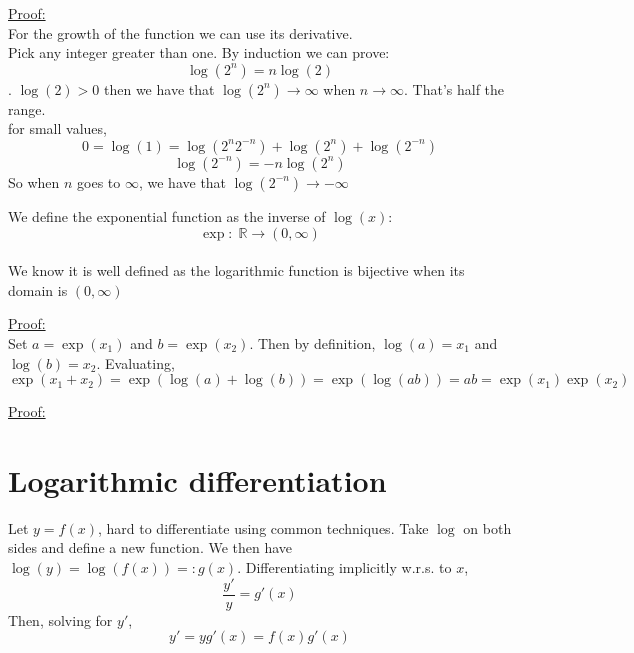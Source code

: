 \documentclass{book}
\newtheorem{theorem}{Theorem}[section]
\newtheorem{definition}{Definition}[section]
\newcommand{\R}{\mathbb{R}}
\begin{document}
\begin{tcolorbox}[width=\textwidth,colback={mygray},title={\begin{theorem} $\log(x)$ is strictly increasing $\forall x>0$. Its range is $(-\infty,\infty)$\end{theorem}},colbacktitle=myblue,coltitle=black]    
\underline{Proof:}\\
For the growth of the function we can use its derivative. 
\\
Pick any integer greater than one. By induction we can prove:$$\log(2^n)=n\log(2)$$. $\log(2)>0$ then we have that $\log(2^n)\longrightarrow \infty$ when $n\longrightarrow\infty$. That's half the range.
\\
for small values, $$0=\log(1)=\log(2^n 2^{-n})+\log(2^n)+\log(2^{-n})$$
$$\log(2^{-n})=-n\log(2^n)$$
So when $n$ goes to $\infty$, we have that $\log(2^{-n})\rightarrow -\infty$
\end{tcolorbox}
\begin{tcolorbox}[width=\textwidth,colback={mygray},title={\begin{definition}Exponential Function\end{definition}},colbacktitle=mygreen,coltitle=black] 
We define the exponential function as the inverse of $\log(x)$:
$$\exp:\; \R\longrightarrow (0,\infty)$$\\
We know it is well defined as the logarithmic function is bijective when its domain is $(0,\infty)$
\end{tcolorbox}
\begin{tcolorbox}[width=\textwidth,colback={mygray},title={\begin{theorem} $\forall x_1,x_2\in\R$ $$\exp(x_1+x_2)=\exp(x_1)\exp(x_2)$$
\end{theorem}},colbacktitle=myblue,coltitle=black] 
\underline{Proof:}\\ Set $a=\exp(x_1)$ and $b=\exp(x_2)$. Then by definition, $\log(a)=x_1$ and $\log(b)=x_2$. Evaluating, 
$$\exp(x_1+x_2)=\exp(\log(a)+\log(b))=\exp(\log(ab))=ab=\exp(x_1)\exp(x_2)$$
\end{tcolorbox}
\begin{tcolorbox}[width=\textwidth,colback={mygray},title={\begin{theorem}
$\exp(x)$ is differentiable $\forall x\in\R$ and its derivative is itself\end{theorem}},colbacktitle=myblue,coltitle=black]
\underline{Proof:}
\end{tcolorbox}
\section{Logarithmic differentiation}
Let $y=f(x)$, hard to differentiate using common techniques. Take $\log$ on both sides and define a new function. We then have $\log(y)=\log(f(x))=:g(x)$. Differentiating implicitly w.r.s. to $x$, $$\frac{y'}{y}=g'(x)$$
Then, solving for $y'$, $$y'=yg'(x)=f(x)g'(x)$$
\end{document}

